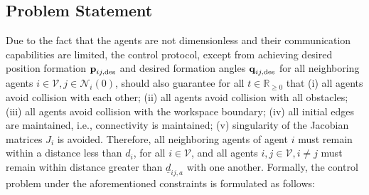 \subsection{Problem Statement}
Due to the fact that the agents are not dimensionless and their communication
capabilities are limited, the control protocol, except from achieving desired
position formation $\bm{\mathbf{p}}_{ij, \text{des}}$ and desired formation angles
$\bm{\mathbf{q}}_{ij, \text{des}}$ for all neighboring agents
$i \in \mathcal{V}, j \in \mathcal{N}_i(0)$, should also guarantee for
all $t\in\mathbb{R}_{\geq 0}$ that
(i) all agents avoid collision with each other;
(ii) all agents avoid collision with all obstacles;
(iii) all agents avoid collision with the workspace boundary;
(iv) all initial edges are maintained, i.e., connectivity is maintained;
(v) singularity of the Jacobian matrices $J_i$ is avoided.
Therefore, all neighboring agents of agent $i$ must remain within a distance
less than $d_i$, for all $i \in \mathcal{V}$,
and all agents $i, j\in \mathcal{V}, i \neq j$ must remain within distance
greater than $\underline{d}_{ij,a}$ with one another.
Formally, the control problem under the aforementioned constraints is
formulated as follows:

